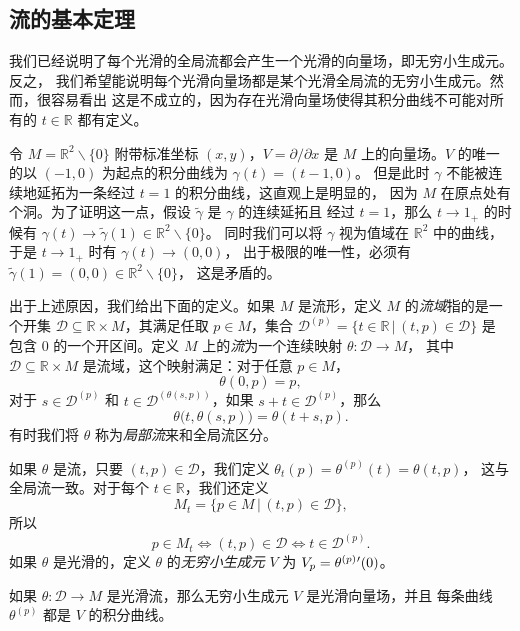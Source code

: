 \documentclass[fontset=none]{Notes}
\begin{document}
\subsection{流的基本定理}

我们已经说明了每个光滑的全局流都会产生一个光滑的向量场，即无穷小生成元。反之，
我们希望能说明每个光滑向量场都是某个光滑全局流的无穷小生成元。然而，很容易看出
这是不成立的，因为存在光滑向量场使得其积分曲线不可能对所有的 $t\in \mathbb{R}$
都有定义。

\begin{example}
  令 $M=\mathbb{R}^2 \smallsetminus\{0\}$ 附带标准坐标 $(x,y)$，$V=\partial/\partial x$ 是 $M$
  上的向量场。$V$ 的唯一的以 $(-1,0)$ 为起点的积分曲线为 $\gamma(t)=(t-1,0)$。
  但是此时 $\gamma$ 不能被连续地延拓为一条经过 $t=1$ 的积分曲线，这直观上是明显的，
  因为 $M$ 在原点处有个洞。为了证明这一点，假设 $\tilde\gamma$ 是 $\gamma$ 的连续延拓且
  经过 $t=1$，那么 $t\to 1_+$ 的时候有 $\gamma(t)\to\tilde{\gamma}(1)\in \mathbb{R}^2 \smallsetminus\{0\}$。
  同时我们可以将 $\gamma$ 视为值域在 $\mathbb{R}^2$ 中的曲线，于是 $t\to 1_+$ 时有 $\gamma(t)\to (0,0)$，
  出于极限的唯一性，必须有 $\tilde{\gamma}(1)=(0,0)\in \mathbb{R}^2 \smallsetminus\{0\}$，
  这是矛盾的。
\end{example}

出于上述原因，我们给出下面的定义。如果 $M$ 是流形，定义 $M$ 的\emph{流域}指的是一个开集
$\mathcal{D}\subseteq \mathbb{R}\times M$，其满足任取 $p\in M$，集合
$\mathcal{D}^{(p)}=\{t\in \mathbb{R}\,|\, (t,p)\in \mathcal{D}\}$ 是
包含 $0$ 的一个开区间。定义 $M$ 上的\emph{流}为一个连续映射 $\theta:\mathcal{D}\to M$，
其中 $\mathcal{D}\subseteq \mathbb{R}\times M$ 是流域，这个映射满足：对于任意 $p\in M$，
\[
  \theta(0,p)=p,
\]
对于 $s\in \mathcal{D}^{(p)}$ 和 $t\in \mathcal{D}^{(\theta(s,p))}$，如果
$s+t\in \mathcal{D}^{(p)}$，那么
\[
  \theta\bigl(t,\theta(s,p)\bigr)=\theta(t+s,p).
\]
有时我们将 $\theta$ 称为\emph{局部流}来和全局流区分。

如果 $\theta$ 是流，只要 $(t,p)\in \mathcal{D}$，我们定义 $\theta_t(p)=\theta^{(p)}(t)=\theta(t,p)$，
这与全局流一致。对于每个 $t\in \mathbb{R}$，我们还定义
\[
  M_t=\{p\in M\,|\, (t,p)\in \mathcal{D}\},
\]
所以
\[
  p\in M_t\Leftrightarrow (t,p)\in \mathcal{D}\Leftrightarrow t\in \mathcal{D}^{(p)}.
\]
如果 $\theta$ 是光滑的，定义 $\theta$ 的\emph{无穷小生成元} $V$ 为 $V_p=\smash{\theta^{(p)}}'(0)$。

\begin{proposition}
  如果 $\theta:\mathcal{D}\to M$ 是光滑流，那么无穷小生成元 $V$ 是光滑向量场，并且
  每条曲线 $\theta^{(p)}$ 都是 $V$ 的积分曲线。
\end{proposition}
\end{document}
